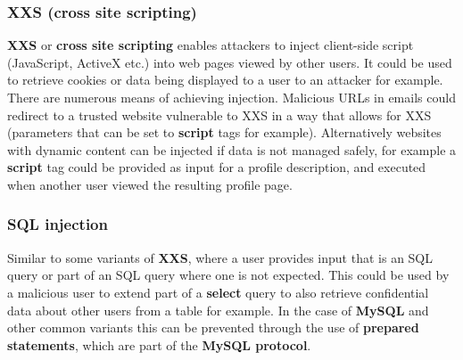 \documentclass[final]{article}
\newcommand{\np}{\vspace{8pt} \\}
\begin{document}
\subsubsection{XXS (cross site scripting)}
\textbf{XXS} or \textbf{cross site scripting} enables attackers to inject client-side script (JavaScript, ActiveX etc.) into web pages viewed by other users. It could be used to retrieve cookies or data being displayed to a user to an attacker for example. \np
There are numerous means of achieving injection. Malicious URLs in emails could redirect to a trusted website vulnerable to XXS in a way that allows for XXS (parameters that can be set to \textbf{script} tags for example). Alternatively websites with dynamic content can be injected if data is not managed safely, for example a \textbf{script} tag could be provided as input for a profile description, and executed when another user viewed the resulting profile page.

\subsubsection{SQL injection}
Similar to some variants of \textbf{XXS}, where a user provides input that is an SQL query or part of an SQL query where one is not expected. This could be used by a malicious user to extend part of a \textbf{select} query to also retrieve confidential data about other users from a table for example. In the case of \textbf{MySQL} and other common variants this can be prevented through the use of \textbf{prepared statements}, which are part of the \textbf{MySQL protocol}.
\end{document}
